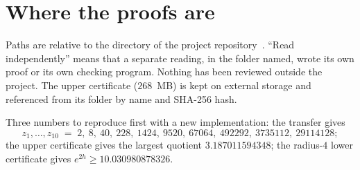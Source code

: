 \section{Where the proofs are}\label{app:where}

Paths are relative to the directory  of the project repository~\cite{Repo}. ``Read
independently'' means that a separate reading, in the folder named, wrote its own proof or its own checking program.
Nothing has been reviewed outside the project. The upper certificate ($268$~MB) is kept on external storage and
referenced from its folder by name and SHA-256 hash.

Three numbers to reproduce first with a new implementation: the transfer gives
\[ z_1,\ldots,z_{10}\;=\;2,\ 8,\ 40,\ 228,\ 1424,\ 9520,\ 67064,\ 492292,\ 3735112,\ 29114128; \]
the upper certificate gives the largest quotient $3.187011594348$; the radius-$4$ lower certificate gives
$e^{2h}\ge10.030980878326$.

